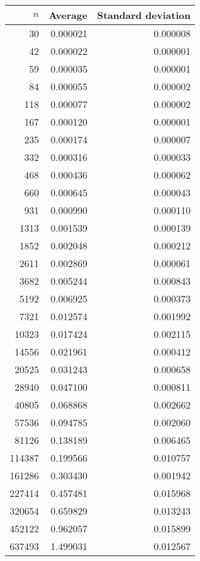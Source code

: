 \begin{tabular}{rrr}
$n$ & Average & Standard deviation\\\hline
30 & 0.000021 & 0.000008\\
42 & 0.000022 & 0.000001\\
59 & 0.000035 & 0.000001\\
84 & 0.000055 & 0.000002\\
118 & 0.000077 & 0.000002\\
167 & 0.000120 & 0.000001\\
235 & 0.000174 & 0.000007\\
332 & 0.000316 & 0.000033\\
468 & 0.000436 & 0.000062\\
660 & 0.000645 & 0.000043\\
931 & 0.000990 & 0.000110\\
1313 & 0.001539 & 0.000139\\
1852 & 0.002048 & 0.000212\\
2611 & 0.002869 & 0.000061\\
3682 & 0.005244 & 0.000843\\
5192 & 0.006925 & 0.000373\\
7321 & 0.012574 & 0.001992\\
10323 & 0.017424 & 0.002115\\
14556 & 0.021961 & 0.000412\\
20525 & 0.031243 & 0.000658\\
28940 & 0.047100 & 0.000811\\
40805 & 0.068868 & 0.002662\\
57536 & 0.094785 & 0.002060\\
81126 & 0.138189 & 0.006465\\
114387 & 0.199566 & 0.010757\\
161286 & 0.303430 & 0.001942\\
227414 & 0.457481 & 0.015968\\
320654 & 0.659829 & 0.013243\\
452122 & 0.962057 & 0.015899\\
637493 & 1.499031 & 0.012567\\
\end{tabular}

